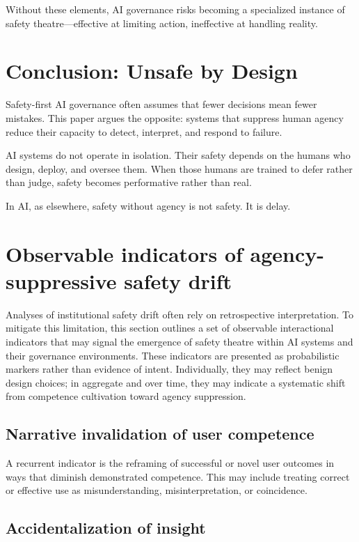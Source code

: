 \documentclass[11pt]{article}
\begin{document}
Without these elements, AI governance risks becoming a specialized instance of safety
theatre---effective at limiting action, ineffective at handling reality.

\section{Conclusion: Unsafe by Design}

Safety-first AI governance often assumes that fewer decisions mean fewer mistakes. This
paper argues the opposite: systems that suppress human agency reduce their capacity to
detect, interpret, and respond to failure.

AI systems do not operate in isolation. Their safety depends on the humans who design,
deploy, and oversee them. When those humans are trained to defer rather than judge,
safety becomes performative rather than real.

In AI, as elsewhere, safety without agency is not safety. It is delay.

\section{Observable indicators of agency-suppressive safety drift}

Analyses of institutional safety drift often rely on retrospective interpretation. To
mitigate this limitation, this section outlines a set of observable interactional
indicators that may signal the emergence of safety theatre within AI systems and their
governance environments. These indicators are presented as probabilistic markers rather
than evidence of intent. Individually, they may reflect benign design choices; in
aggregate and over time, they may indicate a systematic shift from competence
cultivation toward agency suppression.

\subsection{Narrative invalidation of user competence}

A recurrent indicator is the reframing of successful or novel user outcomes in ways
that diminish demonstrated competence. This may include treating correct or effective
use as misunderstanding, misinterpretation, or coincidence.

\subsection{Accidentalization of insight}
\end{document}
